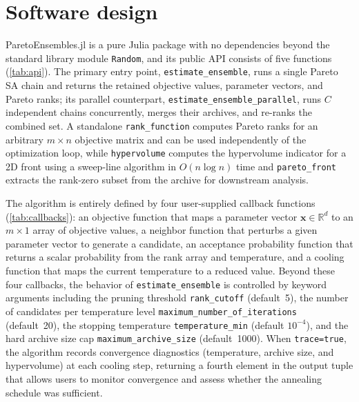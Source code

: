 \documentclass[preprint,review,12pt]{elsarticle}
\begin{document}
\clearpage
\section{Software design}\label{sec:si_software}
ParetoEnsembles.jl is a pure Julia package with no dependencies beyond the standard library module \texttt{Random}, and its public API consists of five functions (\cref{tab:api}).
The primary entry point, \texttt{estimate\_ensemble}, runs a single Pareto SA chain and returns the retained objective values, parameter vectors, and Pareto ranks; its parallel counterpart, \texttt{estimate\_ensemble\_parallel}, runs $C$ independent chains concurrently, merges their archives, and re-ranks the combined set.
A standalone \texttt{rank\_function} computes Pareto ranks for an arbitrary $m \times n$ objective matrix and can be used independently of the optimization loop, while \texttt{hypervolume} computes the hypervolume indicator for a 2D front using a sweep-line algorithm in $O(n \log n)$ time and \texttt{pareto\_front} extracts the rank-zero subset from the archive for downstream analysis.

\begin{sloppypar}
The algorithm is entirely defined by four user-supplied callback functions (\cref{tab:callbacks}): an objective function that maps a parameter vector $\mathbf{x} \in \mathbb{R}^d$ to an $m \times 1$ array of objective values, a neighbor function that perturbs a given parameter vector to generate a candidate, an acceptance probability function that returns a scalar probability from the rank array and temperature, and a cooling function that maps the current temperature to a reduced value.
Beyond these four callbacks, the behavior of \texttt{estimate\_ensemble} is controlled by keyword arguments including the pruning threshold \texttt{rank\_cutoff} (default~5), the number of candidates per temperature level \texttt{maximum\_number\_of\_iterations} (default~20), the stopping temperature \texttt{temperature\_min} (default $10^{-4}$), and the hard archive size cap \texttt{maximum\_archive\_size} (default~1000).
When \texttt{trace=true}, the algorithm records convergence diagnostics (temperature, archive size, and hypervolume) at each cooling step, returning a fourth element in the output tuple that allows users to monitor convergence and assess whether the annealing schedule was sufficient.
\end{sloppypar}
\end{document}
